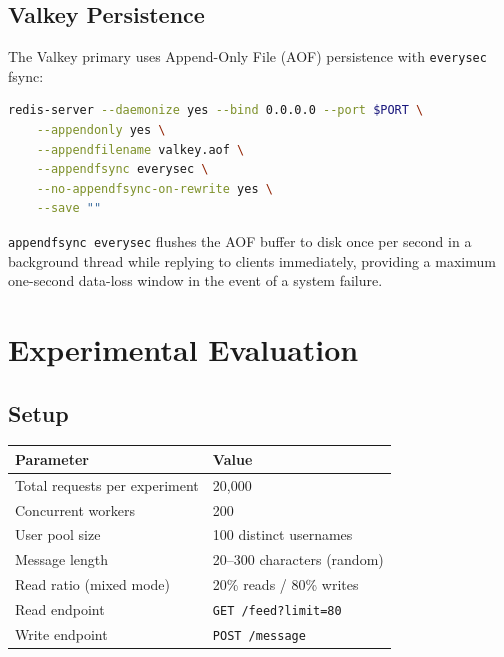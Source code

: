 \documentclass[12pt,a4paper]{article}
\begin{document}
\subsection{Valkey Persistence}

The Valkey primary uses Append-Only File (AOF) persistence with \texttt{everysec} fsync:

\begin{lstlisting}[language=bash, caption={scripts/valkey\_primary.sh --- AOF persistence}]
redis-server --daemonize yes --bind 0.0.0.0 --port $PORT \
    --appendonly yes \
    --appendfilename valkey.aof \
    --appendfsync everysec \
    --no-appendfsync-on-rewrite yes \
    --save ""
\end{lstlisting}

\texttt{appendfsync everysec} flushes the AOF buffer to disk once per second in a background thread while replying to clients immediately, providing a maximum one-second data-loss window in the event of a system failure.

\section{Experimental Evaluation}

\subsection{Setup}

\begin{center}
\begin{tabular}{ll}
\toprule
\textbf{Parameter} & \textbf{Value} \\
\midrule
Total requests per experiment & 20,000 \\
Concurrent workers            & 200 \\
User pool size                & 100 distinct usernames \\
Message length                & 20--300 characters (random) \\
Read ratio (mixed mode)       & 20\% reads / 80\% writes \\
Read endpoint                 & \texttt{GET /feed?limit=80} \\
Write endpoint                & \texttt{POST /message} \\
\bottomrule
\end{tabular}
\end{center}
\end{document}
